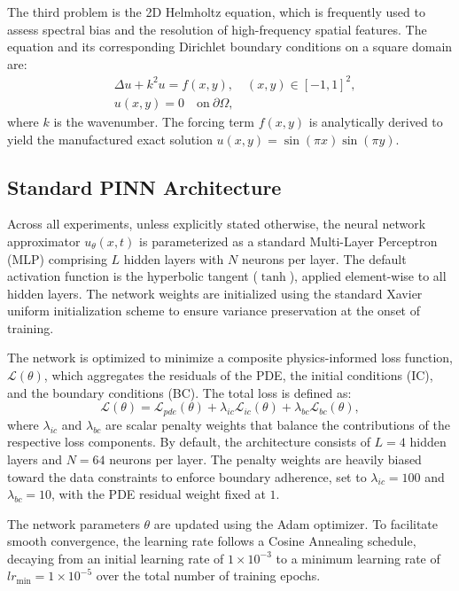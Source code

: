 The third problem is the 2D Helmholtz equation, which is frequently used to assess spectral bias and the resolution of high-frequency spatial features. The equation and its corresponding Dirichlet boundary conditions on a square domain are:
\begin{equation}
\begin{aligned}
    & \Delta u + k^2 u = f(x,y), \quad (x,y) \in [-1, 1]^2, \\
    & u(x,y) = 0 \quad \text{on} \ \partial\Omega,
\end{aligned}
\end{equation}
where $k$ is the wavenumber. The forcing term $f(x,y)$ is analytically derived to yield the manufactured exact solution $u(x,y) = \sin(\pi x)\sin(\pi y)$.

\subsection{Standard PINN Architecture}

Across all experiments, unless explicitly stated otherwise, the neural network approximator $u_\theta(x,t)$ is parameterized as a standard Multi-Layer Perceptron (MLP) comprising $L$ hidden layers with $N$ neurons per layer. The default activation function is the hyperbolic tangent ($\tanh$), applied element-wise to all hidden layers. The network weights are initialized using the standard Xavier uniform initialization scheme to ensure variance preservation at the onset of training.

The network is optimized to minimize a composite physics-informed loss function, $\mathcal{L}(\theta)$, which aggregates the residuals of the PDE, the initial conditions (IC), and the boundary conditions (BC). The total loss is defined as:
\begin{equation}
    \mathcal{L}(\theta) = \mathcal{L}_{pde}(\theta) + \lambda_{ic} \mathcal{L}_{ic}(\theta) + \lambda_{bc} \mathcal{L}_{bc}(\theta),
\end{equation}
where $\lambda_{ic}$ and $\lambda_{bc}$ are scalar penalty weights that balance the contributions of the respective loss components. By default, the architecture consists of $L=4$ hidden layers and $N=64$ neurons per layer. The penalty weights are heavily biased toward the data constraints to enforce boundary adherence, set to $\lambda_{ic}=100$ and $\lambda_{bc}=10$, with the PDE residual weight fixed at $1$.

The network parameters $\theta$ are updated using the Adam optimizer. To facilitate smooth convergence, the learning rate follows a Cosine Annealing schedule, decaying from an initial learning rate of $1\times 10^{-3}$ to a minimum learning rate of $lr_{\min} = 1\times 10^{-5}$ over the total number of training epochs.

